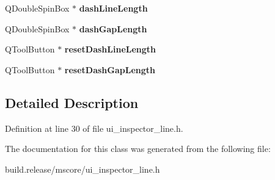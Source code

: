 \begin{DoxyCompactItemize}
\mbox{\label{class_ui___inspector_line_a5c1322b0fb696ef8cf337d6607b19b63}} 
Q\+Double\+Spin\+Box $\ast$ {\bfseries dash\+Line\+Length}
\item 
\mbox{\label{class_ui___inspector_line_aa0dc4670f08d2e45bc6c6c249edc492b}} 
Q\+Double\+Spin\+Box $\ast$ {\bfseries dash\+Gap\+Length}
\item 
\mbox{\label{class_ui___inspector_line_a119ba0c21273617ae93e2b38d76d298a}} 
Q\+Tool\+Button $\ast$ {\bfseries reset\+Dash\+Line\+Length}
\item 
\mbox{\label{class_ui___inspector_line_a73ac9f6bf99027c6330a09c433cac792}} 
Q\+Tool\+Button $\ast$ {\bfseries reset\+Dash\+Gap\+Length}
\end{DoxyCompactItemize}


\subsection{Detailed Description}


Definition at line 30 of file ui\+\_\+inspector\+\_\+line.\+h.



The documentation for this class was generated from the following file\+:\begin{DoxyCompactItemize}
\item 
build.\+release/mscore/ui\+\_\+inspector\+\_\+line.\+h\end{DoxyCompactItemize}
